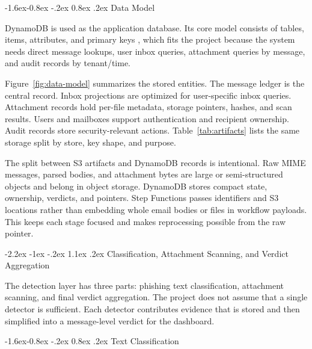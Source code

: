 \documentclass[12pt,a4paper]{article}
\makeatletter
\renewcommand\section{\@startsection {section}{1}{\z@}%
  {-2.2ex \@plus -1ex \@minus -.2ex}%
  {1.1ex \@plus .2ex}%
  {\centering\normalfont\normalsize\bfseries}}
\renewcommand\subsection{\@startsection{subsection}{2}{\z@}%
  {-1.6ex\@plus -0.8ex \@minus -.2ex}%
  {0.8ex \@plus .2ex}%
  {\normalfont\normalsize\bfseries}}
\makeatother
\begin{document}
\subsection{Data Model}

DynamoDB is used as the application database. Its core model consists of tables, items, attributes, and primary keys \cite{aws_dynamodb_components}, which fits the project because the system needs direct message lookups, user inbox queries, attachment queries by message, and audit records by tenant/time.

\begin{center}
\resizebox{0.76\textwidth}{!}{}
\label{fig:data-model}
\end{center}

Figure~\ref{fig:data-model} summarizes the stored entities. The message ledger is the central record. Inbox projections are optimized for user-specific inbox queries. Attachment records hold per-file metadata, storage pointers, hashes, and scan results. Users and mailboxes support authentication and recipient ownership. Audit records store security-relevant actions. Table~\ref{tab:artifacts} lists the same storage split by store, key shape, and purpose.



The split between S3 artifacts and DynamoDB records is intentional. Raw MIME messages, parsed bodies, and attachment bytes are large or semi-structured objects and belong in object storage. DynamoDB stores compact state, ownership, verdicts, and pointers. Step Functions passes identifiers and S3 locations rather than embedding whole email bodies or files in workflow payloads. This keeps each stage focused and makes reprocessing possible from the raw pointer.

\section{Classification, Attachment Scanning, and Verdict Aggregation}

The detection layer has three parts: phishing text classification, attachment scanning, and final verdict aggregation. The project does not assume that a single detector is sufficient. Each detector contributes evidence that is stored and then simplified into a message-level verdict for the dashboard.

\subsection{Text Classification}
\end{document}
